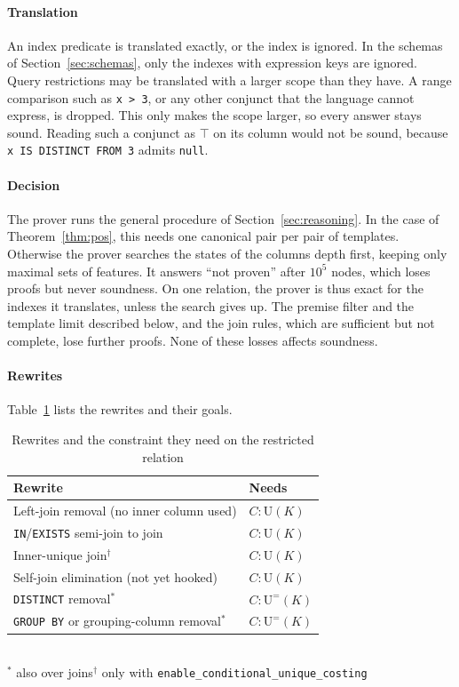 \documentclass[conference]{IEEEtran}
\theoremstyle{definition}
\newcommand{\sql}[1]{\texttt{#1}}
\newcommand{\nul}{\texttt{null}}
\newcommand{\U}[1]{\mathrm{U}(#1)}
\newcommand{\Ueq}[1]{\mathrm{U}^{=}(#1)}
\begin{document}
\paragraph*{Translation} An index predicate is translated exactly, or the index is ignored. In the schemas of
Section~\ref{sec:schemas}, only the indexes with expression keys are ignored. Query restrictions may be translated with
a larger scope than they have. A range comparison such as \sql{x > 3}, or any other conjunct that the language cannot
express, is dropped. This only makes the scope larger, so every answer stays sound. Reading such a conjunct as $\top$
on its column would not be sound, because \sql{x IS DISTINCT FROM 3} admits \nul.

\paragraph*{Decision} The prover runs the general procedure of Section~\ref{sec:reasoning}. In the case of
Theorem~\ref{thm:pos}, this needs one canonical pair per pair of templates. Otherwise the prover searches the states of
the columns depth first, keeping only maximal sets of features. It answers ``not proven'' after $10^5$ nodes, which loses
proofs but never soundness. On one relation, the prover is thus exact for the indexes it translates, unless the search
gives up. The premise filter and the template limit described below, and the join rules, which are sufficient but not
complete, lose further proofs. None of these losses affects soundness.

\paragraph*{Rewrites} Table~\ref{tab:rewrites} lists the rewrites and their goals.
\begin{table}[t]
\caption{Rewrites and the constraint they need on the restricted relation}\label{tab:rewrites}
\centering\small
\begin{tabular}{ll}
\toprule
Rewrite & Needs \\
\midrule
Left-join removal (no inner column used) & $C:\U{K}$ \\
\sql{IN}/\sql{EXISTS} semi-join to join & $C:\U{K}$ \\
Inner-unique join$^\dagger$ & $C:\U{K}$ \\
Self-join elimination (not yet hooked) & $C:\U{K}$ \\
\sql{DISTINCT} removal$^*$ & $C:\Ueq{K}$ \\
\sql{GROUP BY} or grouping-column removal$^*$ & $C:\Ueq{K}$ \\
\bottomrule
\end{tabular}
\\[2pt]{\footnotesize $^*$ also over joins\quad $^\dagger$ only with \sql{enable\_conditional\_unique\_costing}}
\end{table}
\end{document}

